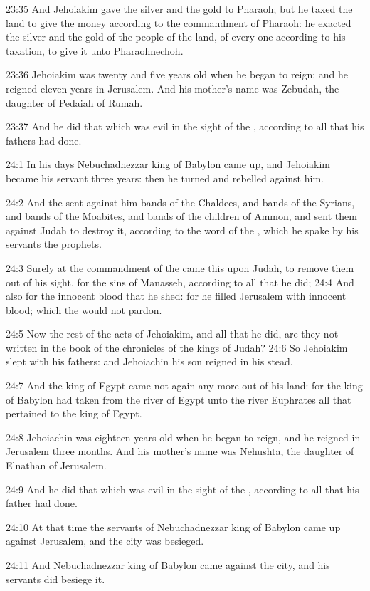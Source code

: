 23:35 And Jehoiakim gave the silver and the gold to Pharaoh; but he taxed the land to give the money according to the commandment of Pharaoh: he exacted the silver and the gold of the people of the land, of every one according to his taxation, to give it unto Pharaohnechoh.

23:36 Jehoiakim was twenty and five years old when he began to reign; and he reigned eleven years in Jerusalem. And his mother's name was Zebudah, the daughter of Pedaiah of Rumah.

23:37 And he did that which was evil in the sight of the \LORD, according to all that his fathers had done.

24:1 In his days Nebuchadnezzar king of Babylon came up, and Jehoiakim became his servant three years: then he turned and rebelled against him.

24:2 And the \LORD sent against him bands of the Chaldees, and bands of the Syrians, and bands of the Moabites, and bands of the children of Ammon, and sent them against Judah to destroy it, according to the word of the \LORD, which he spake by his servants the prophets.

24:3 Surely at the commandment of the \LORD came this upon Judah, to remove them out of his sight, for the sins of Manasseh, according to all that he did; 24:4 And also for the innocent blood that he shed: for he filled Jerusalem with innocent blood; which the \LORD would not pardon.

24:5 Now the rest of the acts of Jehoiakim, and all that he did, are they not written in the book of the chronicles of the kings of Judah?  24:6 So Jehoiakim slept with his fathers: and Jehoiachin his son reigned in his stead.

24:7 And the king of Egypt came not again any more out of his land: for the king of Babylon had taken from the river of Egypt unto the river Euphrates all that pertained to the king of Egypt.

24:8 Jehoiachin was eighteen years old when he began to reign, and he reigned in Jerusalem three months. And his mother's name was Nehushta, the daughter of Elnathan of Jerusalem.

24:9 And he did that which was evil in the sight of the \LORD, according to all that his father had done.

24:10 At that time the servants of Nebuchadnezzar king of Babylon came up against Jerusalem, and the city was besieged.

24:11 And Nebuchadnezzar king of Babylon came against the city, and his servants did besiege it.

